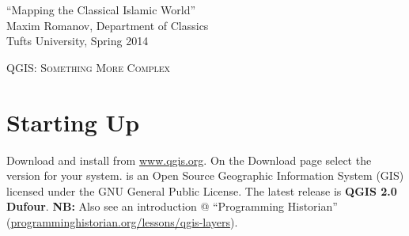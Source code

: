 \documentclass[12pt,oneside]{article}
\begin{document}

\begin{flushright}
\begin{footnotesize}
``Mapping the Classical Islamic World''\\
Maxim Romanov, Department of Classics\\
Tufts University, Spring 2014\\
\end{footnotesize}
\end{flushright}

\begin{center}
\begin{Large}
\textsc{QGIS: Something More Complex}
\end{Large}
\end{center}

\section{Starting Up}

Download and install \QGIS from \href{http://www.qgis.org/en/site/forusers/download.html}{www.qgis.org}. On the Download page select the version for your system. \QGIS is an Open Source Geographic Information System (GIS) licensed under the GNU General Public License. The latest release is \textbf{QGIS 2.0 Dufour}. \textbf{NB:} Also see an introduction @ ``Programming Historian'' (\href{http://programminghistorian.org/lessons/qgis-layers}{programminghistorian.org/lessons/qgis-layers}).
\end{document}
